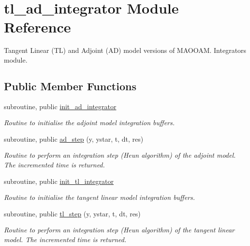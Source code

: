 \hypertarget{classtl__ad__integrator}{\section{tl\-\_\-ad\-\_\-integrator Module Reference}
\label{classtl__ad__integrator}
}


Tangent Linear (T\-L) and Adjoint (A\-D) model versions of M\-A\-O\-O\-A\-M. Integrators module.  


\subsection*{Public Member Functions}
\begin{DoxyCompactItemize}
\item 
subroutine, public \hyperlink{classtl__ad__integrator_a045e54a1993c61624ce05b4034281fdd}{init\-\_\-ad\-\_\-integrator}
\begin{DoxyCompactList}\small\item\em Routine to initialise the adjoint model integration buffers. \end{DoxyCompactList}\item 
subroutine, public \hyperlink{classtl__ad__integrator_a9a17fdc7893645681d1eacc5c10dc904}{ad\-\_\-step} (y, ystar, t, dt, res)
\begin{DoxyCompactList}\small\item\em Routine to perform an integration step (Heun algorithm) of the adjoint model. The incremented time is returned. \end{DoxyCompactList}\item 
subroutine, public \hyperlink{classtl__ad__integrator_a108b50162df8b4346ef28ef57303de96}{init\-\_\-tl\-\_\-integrator}
\begin{DoxyCompactList}\small\item\em Routine to initialise the tangent linear model integration buffers. \end{DoxyCompactList}\item 
subroutine, public \hyperlink{classtl__ad__integrator_a2c60270052c2a34e959412f2a3be5421}{tl\-\_\-step} (y, ystar, t, dt, res)
\begin{DoxyCompactList}\small\item\em Routine to perform an integration step (Heun algorithm) of the tangent linear model. The incremented time is returned. \end{DoxyCompactList}\end{DoxyCompactItemize}
